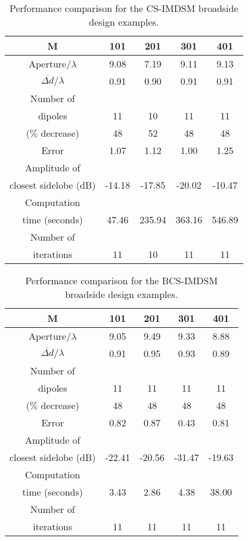 \documentclass[10pt,final]{IEEEtran}
\begin{document}
\begin{table}
\caption{\rm Performance comparison for the CS-IMDSM broadside design examples.} \centering
\begin{tabular}{|c|c|c|c|c|}
  \hline
  M & 101 & 201 & 301 & 401 \\
  \hline
  Aperture/$\lambda$ & 9.08 & 7.19 & 9.11 & 9.13\\
  $\overline{\Delta{d}}/\lambda$ & 0.91 & 0.90 & 0.91& 0.91\\
  \hline
  Number of &  &  & & \\
  dipoles & 11 & 10 & 11 &11\\
  ($\%$ decrease) & 48 & 52 & 48&48 \\
  \hline
  Error & 1.07 & 1.12 & 1.00& 1.25\\
  \hline
  Amplitude of &  &  & & \\
  closest sidelobe (dB)& -14.18 & -17.85 & -20.02 &-10.47\\
  \hline
  Computation &  &  &  &\\
  time (seconds) & 47.46 & 235.94 & 363.16 &546.89\\
  \hline
  Number of &  &  & & \\
  iterations & 11 & 10 & 11 & 11\\
  \hline
\end{tabular}
\label{tb:broadCS}
\end{table}

\begin{table}
\caption{\rm Performance comparison for the BCS-IMDSM broadside design examples.} \centering
\begin{tabular}{|c|c|c|c|c|}
  \hline
  M & 101 & 201 & 301 & 401 \\
  \hline
  Aperture/$\lambda$ & 9.05 & 9.49 & 9.33 & 8.88\\
  $\overline{\Delta{d}}/\lambda$ & 0.91 & 0.95 & 0.93& 0.89\\
  \hline
  Number of &  &  & & \\
  dipoles & 11 & 11 & 11 &11\\
  ($\%$ decrease) &48  & 48 &48 & 48\\
  \hline
  Error & 0.82 & 0.87 & 0.43& 0.81\\
  \hline
  Amplitude of &  &  & & \\
  closest sidelobe (dB)& -22.41 & -20.56 & -31.47 &-19.63\\
  \hline
  Computation &  &  &  &\\
  time (seconds) & 3.43 & 2.86 & 4.38 &38.00\\
  \hline
  Number of &  &  & & \\
  iterations & 11 & 11 & 11 & 11\\
  \hline
\end{tabular}
\label{tb:broadBCS}
\end{table}
\end{document}
